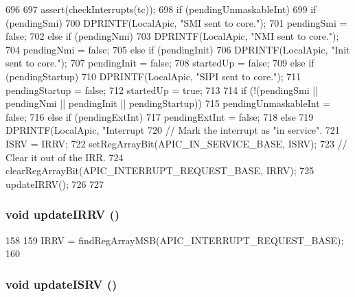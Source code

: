 \begin{DoxyCode}
696 {
697     assert(checkInterrupts(tc));
698     if (pendingUnmaskableInt) {
699         if (pendingSmi) {
700             DPRINTF(LocalApic, "SMI sent to core.\n");
701             pendingSmi = false;
702         } else if (pendingNmi) {
703             DPRINTF(LocalApic, "NMI sent to core.\n");
704             pendingNmi = false;
705         } else if (pendingInit) {
706             DPRINTF(LocalApic, "Init sent to core.\n");
707             pendingInit = false;
708             startedUp = false;
709         } else if (pendingStartup) {
710             DPRINTF(LocalApic, "SIPI sent to core.\n");
711             pendingStartup = false;
712             startedUp = true;
713         }
714         if (!(pendingSmi || pendingNmi || pendingInit || pendingStartup))
715             pendingUnmaskableInt = false;
716     } else if (pendingExtInt) {
717         pendingExtInt = false;
718     } else {
719         DPRINTF(LocalApic, "Interrupt %
720         // Mark the interrupt as "in service".
721         ISRV = IRRV;
722         setRegArrayBit(APIC_IN_SERVICE_BASE, ISRV);
723         // Clear it out of the IRR.
724         clearRegArrayBit(APIC_INTERRUPT_REQUEST_BASE, IRRV);
725         updateIRRV();
726     }
727 }
\end{DoxyCode}
\hypertarget{classX86ISA_1_1Interrupts_a9e275b8054220a16ea40b772c0c04d96}{
\subsubsection[{updateIRRV}]{\setlength{\rightskip}{0pt plus 5cm}void updateIRRV ()}}
\label{classX86ISA_1_1Interrupts_a9e275b8054220a16ea40b772c0c04d96}



\begin{DoxyCode}
158     {
159         IRRV = findRegArrayMSB(APIC_INTERRUPT_REQUEST_BASE);
160     }
\end{DoxyCode}
\hypertarget{classX86ISA_1_1Interrupts_af645e39703e6f7ea975409c79fc0f41b}{
\subsubsection[{updateISRV}]{\setlength{\rightskip}{0pt plus 5cm}void updateISRV ()}}
\label{classX86ISA_1_1Interrupts_af645e39703e6f7ea975409c79fc0f41b}



